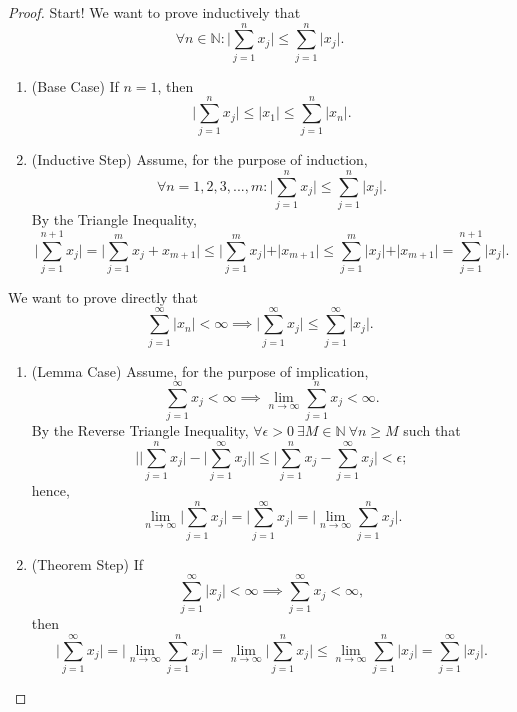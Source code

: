 \documentclass[12pt]{article}
\theoremstyle{definition}
\begin{document}
\begin{proof}
    Start! We want to prove inductively that
    \[
        \forall n \in \mathbb{N} : \bigg\vert \sum_{j = 1}^{n}x_j \bigg\vert \leq \sum_{j = 1}^{n}\vert x_j \vert.
    \]
    \begin{enumerate}[label=\arabic*)]
        \item (Base Case) If $n = 1$, then
        \[
            \bigg\vert \sum_{j = 1}^n x_j \bigg\vert \leq \vert x_1 \vert \leq \sum_{j = 1}^n \vert x_n \vert.
        \]
        \item (Inductive Step) Assume, for the purpose of induction,
        \[
            \forall n = 1, 2, 3, ..., m : \bigg\vert \sum_{j = 1}^{n}x_j \bigg\vert \leq \sum_{j = 1}^{n}\vert x_j \vert.
        \]
        By the Triangle Inequality,
        \[
            \bigg\vert \sum_{j = 1}^{n + 1}x_j \bigg\vert = \bigg\vert \sum_{j = 1}^{m}x_j + x_{m + 1} \bigg\vert \leq \bigg\vert \sum_{j = 1}^{m}x_j \bigg\vert + \vert x_{m + 1} \vert \leq \sum_{j = 1}^{m}\vert x_j \vert + \vert x_{m + 1} \vert = \sum_{j = 1}^{n + 1}\vert x_j \vert.
        \]
    \end{enumerate}
    We want to prove directly that
    \[
        \sum_{j = 1}^{\infty}\vert x_n \vert < \infty \implies \bigg\vert \sum_{j = 1}^{\infty}x_j \bigg\vert \leq \sum_{j = 1}^{\infty}\vert x_j \vert.
    \]
    \begin{enumerate}[label=\arabic*)]
        \item (Lemma Case) Assume, for the purpose of implication,
        \[
            \sum_{j = 1}^{\infty}x_j < \infty \implies \lim_{n \to \infty}\sum_{j = 1}^{n}x_j < \infty.
        \]
        By the Reverse Triangle Inequality, \(\forall \epsilon > 0 \ \exists M \in \mathbb{N} \ \forall n \geq M\) such that
        \[
            \bigg\vert \bigg\vert \sum_{j = 1}^{n}x_j \bigg\vert - \bigg\vert \sum_{j = 1}^{\infty}x_j \bigg\vert \bigg\vert \leq \bigg\vert \sum_{j = 1}^{n}x_j - \sum_{j = 1}^{\infty}x_j \bigg\vert < \epsilon;
        \]
        hence,
        \[
            \lim_{n \to \infty}\bigg\vert \sum_{j = 1}^{n}x_j \bigg\vert = \bigg\vert \sum_{j = 1}^{\infty}x_j \bigg\vert = \bigg\vert \lim_{n \to \infty}\sum_{j = 1}^{n}x_j \bigg\vert. 
        \]
        \item (Theorem Step) If
        \[
            \sum_{j = 1}^{\infty}\vert x_j \vert < \infty \implies \sum_{j = 1}^{\infty}x_j < \infty,
        \]
        then
        \[
            \bigg\vert \sum_{j = 1}^{\infty}x_j \bigg\vert = \bigg\vert \lim_{n \to \infty}\sum_{j = 1}^{n}x_j \bigg\vert = \lim_{n \to \infty}\bigg\vert \sum_{j = 1}^{n}x_j \bigg\vert \leq \lim_{n \to \infty}\sum_{j = 1}^{n}\vert x_j \vert = \sum_{j = 1}^{\infty}\vert x_j \vert.
        \]
    \end{enumerate}
\end{proof}
\end{document}
